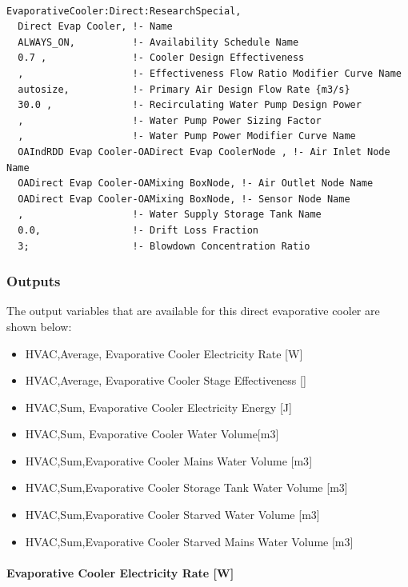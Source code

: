 \begin{lstlisting}

EvaporativeCooler:Direct:ResearchSpecial,
  Direct Evap Cooler, !- Name
  ALWAYS_ON,          !- Availability Schedule Name
  0.7 ,               !- Cooler Design Effectiveness
  ,                   !- Effectiveness Flow Ratio Modifier Curve Name
  autosize,           !- Primary Air Design Flow Rate {m3/s}
  30.0 ,              !- Recirculating Water Pump Design Power
  ,                   !- Water Pump Power Sizing Factor
  ,                   !- Water Pump Power Modifier Curve Name
  OAIndRDD Evap Cooler-OADirect Evap CoolerNode , !- Air Inlet Node Name
  OADirect Evap Cooler-OAMixing BoxNode, !- Air Outlet Node Name
  OADirect Evap Cooler-OAMixing BoxNode, !- Sensor Node Name
  ,                   !- Water Supply Storage Tank Name
  0.0,                !- Drift Loss Fraction
  3;                  !- Blowdown Concentration Ratio
\end{lstlisting}

\subsubsection{Outputs}\label{outputs-1-009}

The output variables that are available for this direct evaporative cooler are shown below:

\begin{itemize}
\item
  HVAC,Average, Evaporative Cooler Electricity Rate {[}W{]}
\item
  HVAC,Average, Evaporative Cooler Stage Effectiveness {[]}
\item
  HVAC,Sum, Evaporative Cooler Electricity Energy {[}J{]}
\item
  HVAC,Sum, Evaporative Cooler Water Volume{[}m3{]}
\item
  HVAC,Sum,Evaporative Cooler Mains Water Volume {[}m3{]}
\item
  HVAC,Sum,Evaporative Cooler Storage Tank Water Volume {[}m3{]}
\item
  HVAC,Sum,Evaporative Cooler Starved Water Volume {[}m3{]}
\item
  HVAC,Sum,Evaporative Cooler Starved Mains Water Volume {[}m3{]}
\end{itemize}

\paragraph{Evaporative Cooler Electricity Rate {[}W{]}}\label{evaporative-cooler-electric-powerw-1}

